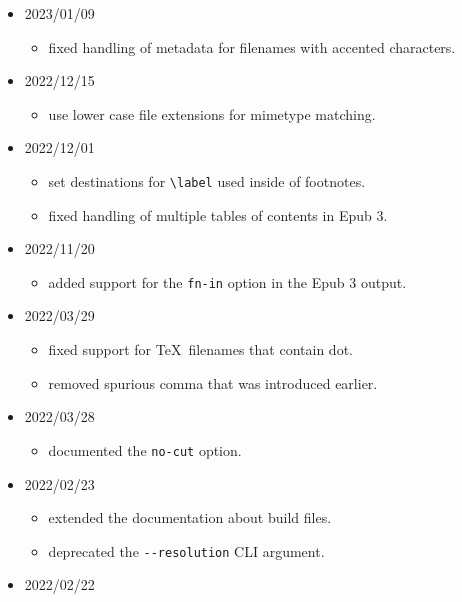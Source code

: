 \begin{itemize}
  \begin{itemize}
  \tightlist
  \item
    added all mimetypes supported in Epub.
  \end{itemize}
\item
  2023/01/09

  \begin{itemize}
  \tightlist
  \item
    fixed handling of metadata for filenames with accented characters.
  \end{itemize}
\item
  2022/12/15

  \begin{itemize}
  \tightlist
  \item
    use lower case file extensions for mimetype matching.
  \end{itemize}
\item
  2022/12/01

  \begin{itemize}
  \tightlist
  \item
    set destinations for \texttt{\textbackslash{}label} used inside of
    footnotes.
  \item
    fixed handling of multiple tables of contents in Epub 3.
  \end{itemize}
\item
  2022/11/20

  \begin{itemize}
  \tightlist
  \item
    added support for the \texttt{fn-in} option in the Epub 3 output.
  \end{itemize}
\item
  2022/03/29

  \begin{itemize}
  \tightlist
  \item
    fixed support for \TeX~filenames that contain dot.
  \item
    removed spurious comma that was introduced earlier.
  \end{itemize}
\item
  2022/03/28

  \begin{itemize}
  \tightlist
  \item
    documented the \texttt{no-cut} option.
  \end{itemize}
\item
  2022/02/23

  \begin{itemize}
  \tightlist
  \item
    extended the documentation about build files.
  \item
    deprecated the \texttt{-\/-resolution} CLI argument.
  \end{itemize}
\item
  2022/02/22


\end{itemize}
